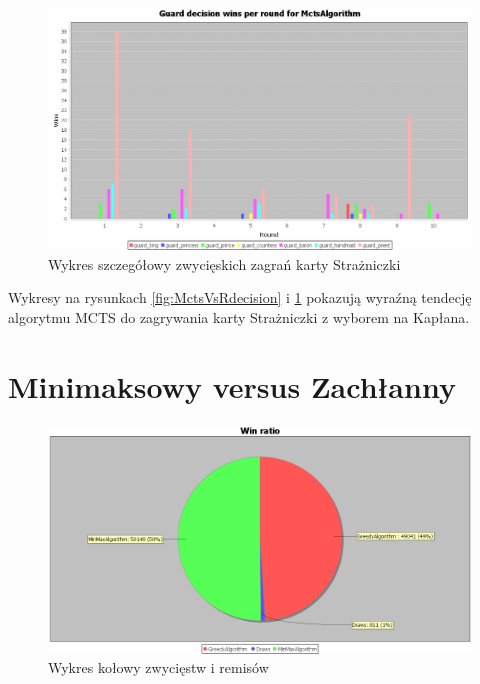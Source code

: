 \begin{figure}[H]
	\centering
	\includegraphics[width=\textwidth]{Resources/MctsVsR/MctsVsRguarddecision.PNG}
	\caption{Wykres szczegółowy zwycięskich zagrań karty Strażniczki} 
	\label{fig:MctsVsRguarddecision}
\end{figure}

Wykresy na rysunkach \ref{fig:MctsVsRdecision} i \ref{fig:MctsVsRguarddecision} pokazują wyraźną tendecję algorytmu MCTS do zagrywania karty Strażniczki z wyborem na Kapłana.

\section{Minimaksowy versus Zachłanny}
\begin{figure}[H]
	\centering
	\includegraphics[width=\textwidth]{Resources/MirrorMmVsG/GVsMmWin.PNG}
	\caption{Wykres kołowy zwycięstw i remisów} 
	\label{fig:MirrorGVsMmWin}
\end{figure}

